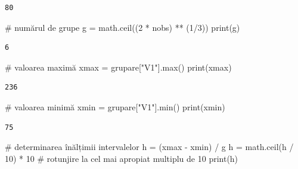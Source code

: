\documentclass[
  11pt,
  b5paper,
  nottoc]{book}
\newenvironment{Shaded}{\begin{snugshade}}{\end{snugshade}}
\newcommand{\BuiltInTok}[1]{\textcolor[rgb]{0.00,0.23,0.31}{#1}}
\newcommand{\CommentTok}[1]{\textcolor[rgb]{0.37,0.37,0.37}{#1}}
\newcommand{\DecValTok}[1]{\textcolor[rgb]{0.68,0.00,0.00}{#1}}
\newcommand{\NormalTok}[1]{\textcolor[rgb]{0.00,0.23,0.31}{#1}}
\newcommand{\OperatorTok}[1]{\textcolor[rgb]{0.37,0.37,0.37}{#1}}
\newcommand{\StringTok}[1]{\textcolor[rgb]{0.13,0.47,0.30}{#1}}
\begin{document}
\begin{verbatim}
80
\end{verbatim}

\begin{Shaded}
\begin{Highlighting}[]
\CommentTok{\# numărul de grupe}
\NormalTok{g }\OperatorTok{=}\NormalTok{ math.ceil((}\DecValTok{2} \OperatorTok{*}\NormalTok{ nobs) }\OperatorTok{**}\NormalTok{ (}\DecValTok{1}\OperatorTok{/}\DecValTok{3}\NormalTok{))}
\BuiltInTok{print}\NormalTok{(g)}
\end{Highlighting}
\end{Shaded}

\begin{verbatim}
6
\end{verbatim}

\begin{Shaded}
\begin{Highlighting}[]
\CommentTok{\# valoarea maximă}
\NormalTok{xmax }\OperatorTok{=}\NormalTok{ grupare[}\StringTok{"V1"}\NormalTok{].}\BuiltInTok{max}\NormalTok{()}
\BuiltInTok{print}\NormalTok{(xmax)}
\end{Highlighting}
\end{Shaded}

\begin{verbatim}
236
\end{verbatim}

\begin{Shaded}
\begin{Highlighting}[]
\CommentTok{\# valoarea minimă}
\NormalTok{xmin }\OperatorTok{=}\NormalTok{ grupare[}\StringTok{"V1"}\NormalTok{].}\BuiltInTok{min}\NormalTok{()}
\BuiltInTok{print}\NormalTok{(xmin)}
\end{Highlighting}
\end{Shaded}

\begin{verbatim}
75
\end{verbatim}

\begin{Shaded}
\begin{Highlighting}[]
\CommentTok{\# determinarea înălțimii intervalelor}
\NormalTok{h }\OperatorTok{=}\NormalTok{ (xmax }\OperatorTok{{-}}\NormalTok{ xmin) }\OperatorTok{/}\NormalTok{ g}
\NormalTok{h }\OperatorTok{=}\NormalTok{ math.ceil(h }\OperatorTok{/} \DecValTok{10}\NormalTok{) }\OperatorTok{*} \DecValTok{10}  \CommentTok{\# rotunjire la cel mai apropiat multiplu de 10}
\BuiltInTok{print}\NormalTok{(h)}
\end{Highlighting}
\end{Shaded}
\end{document}
